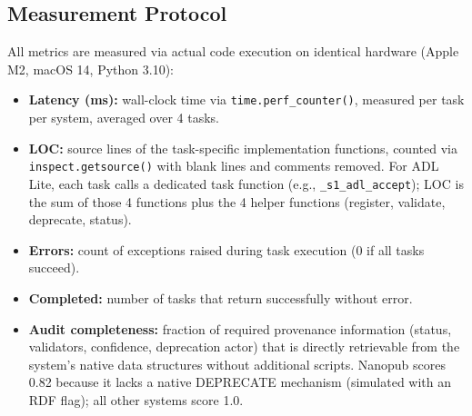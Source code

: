 \subsection{Measurement Protocol}

All metrics are measured via actual code execution on identical hardware (Apple M2, macOS 14, Python 3.10):

\begin{itemize}[leftmargin=2em]
    \item \textbf{Latency (ms):} wall-clock time via \texttt{time.perf\_counter()}, measured per task per system, averaged over 4 tasks.
    \item \textbf{LOC:} source lines of the task-specific implementation functions, counted via \texttt{inspect.getsource()} with blank lines and comments removed. For ADL Lite, each task calls a dedicated task function (e.g., \texttt{\_s1\_adl\_accept}); LOC is the sum of those 4 functions plus the 4 helper functions (register, validate, deprecate, status).
    \item \textbf{Errors:} count of exceptions raised during task execution (0 if all tasks succeed).
    \item \textbf{Completed:} number of tasks that return successfully without error.
    \item \textbf{Audit completeness:} fraction of required provenance information (status, validators, confidence, deprecation actor) that is directly retrievable from the system's native data structures without additional scripts. Nanopub scores 0.82 because it lacks a native DEPRECATE mechanism (simulated with an RDF flag); all other systems score 1.0.
\end{itemize}

